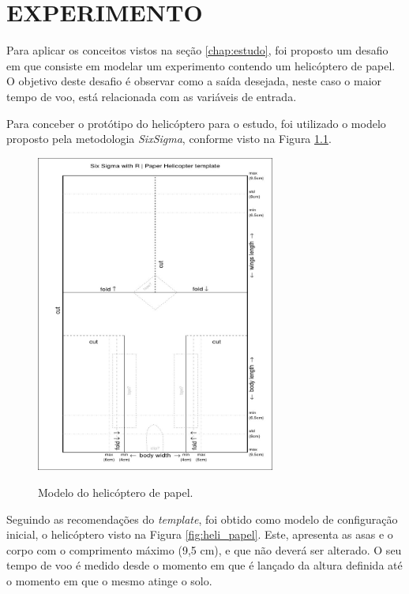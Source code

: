 \chapter{EXPERIMENTO}
\label{chap:experimento}

Para aplicar os conceitos vistos na seção \ref{chap:estudo}, foi proposto um desafio em que consiste em modelar um experimento contendo um helicóptero de papel. O objetivo deste desafio é observar como a saída desejada, neste caso o maior tempo de voo, está relacionada com as variáveis de entrada.  

Para conceber o protótipo do helicóptero para o estudo, foi utilizado o modelo proposto pela metodologia \textit{SixSigma}, conforme visto na Figura \ref{fig:model_heli}. 

\begin{figure}[H]
  \caption{Modelo do helicóptero de papel.}
  \centering
  \includegraphics[width=0.7\textwidth]{images/helicopter.jpeg}
  \label{fig:model_heli}
\end{figure}

Seguindo as recomendações do \textit{template}, foi obtido como modelo de configuração inicial, o helicóptero visto na Figura \ref{fig:heli_papel}. Este, apresenta as asas e o corpo com o comprimento máximo (9,5 cm), e que não deverá ser alterado. O seu tempo de voo é medido desde o momento em que é lançado da altura definida até o momento em que o mesmo atinge o solo.


